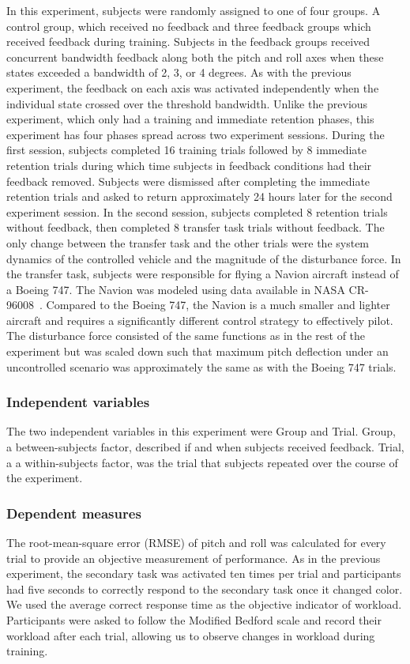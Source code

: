 In this experiment, subjects were randomly assigned to one of four groups.
A control group, which received no feedback and three feedback groups which received feedback during training.
Subjects in the feedback groups received concurrent bandwidth feedback along both the pitch and roll axes when these states exceeded a bandwidth of 2, 3, or 4 degrees.
As with the previous experiment, the feedback on each axis was activated independently when the individual state crossed over the threshold bandwidth.
Unlike the previous experiment, which only had a training and immediate retention phases, this experiment has four phases spread across two experiment sessions.
During the first session, subjects completed 16 training trials followed by 8 immediate retention trials during which time subjects in feedback conditions had their feedback removed.
Subjects were dismissed after completing the immediate retention trials and asked to return approximately 24 hours later for the second experiment session.
In the second session, subjects completed 8 retention trials without feedback, then completed 8 transfer task trials without feedback.
The only change between the transfer task and the other trials were the system dynamics of the controlled vehicle and the magnitude of the disturbance force.
In the transfer task, subjects were responsible for flying a Navion aircraft instead of a Boeing 747.
The Navion was modeled using data available in NASA CR-96008~\citep{teper1969aircraft}.
Compared to the Boeing 747, the Navion is a much smaller and lighter aircraft and requires a significantly different control strategy to effectively pilot.
The disturbance force consisted of the same functions as in the rest of the experiment but was scaled down such that maximum pitch deflection under an uncontrolled scenario was approximately the same as with the Boeing 747 trials.

\subsubsection{Independent variables}
The two independent variables in this experiment were Group and Trial.
Group, a between-subjects factor, described if and when subjects received feedback.
Trial, a a within-subjects factor, was the trial that subjects repeated over the course of the experiment.

\subsubsection{Dependent measures}
The root-mean-square error (RMSE) of pitch and roll was calculated for every trial to provide an objective measurement of performance.
As in the previous experiment, the secondary task was activated ten times per trial and participants had five seconds to correctly respond to the secondary task once it changed color.
We used the average correct response time as the objective indicator of workload.
Participants were asked to follow the Modified Bedford scale and record their workload after each trial, allowing us to observe changes in workload during training.

